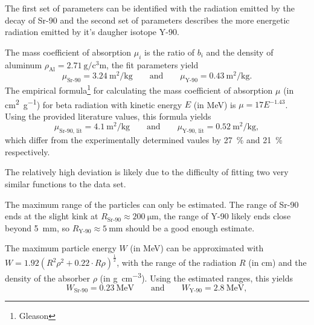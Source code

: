 The first set of parameters can be identified with the radiation emitted by the decay of Sr-90 and the second set of parameters describes the more energetic radiation emitted by it's daugher isotope Y-90.

The mass coefficient of absorption $\mu_i$ is the ratio of $b_i$ and the density of aluminum $\rho_\text{Al} = \SI{2.71}{\gram\per\cubic\centi\meter}$, the fit parameters yield
\begin{equation*}
	\mu_\text{Sr-90} = \SI{3.24}{\meter\squared\per\kilo\gram} \qquad \text{and} \qquad \mu_\text{Y-90} = \SI{0.43}{\meter\squared\per\kilo\gram}.
\end{equation*}
The empirical formula\footnote{Gleason} for calculating the mass coefficient of absorption $\mu$ (in \si{\centi\meter\squared\per\gram}) for beta radiation with kinetic energy $E$ (in \si{\MeV}) is $\mu = 17 E^{-1.43}$.
Using the provided literature values, this formula yields
\begin{equation*}
	\mu_\text{Sr-90, lit} = \SI{4.1}{\meter\squared\per\kilo\gram} \qquad \text{and} \qquad \mu_\text{Y-90, lit} = \SI{0.52}{\meter\squared\per\kilo\gram},
\end{equation*}
which differ from the experimentally determined vaules by \SI{27}{\percent} and \SI{21}{\percent} respectively.

The relatively high deviation is likely due to the difficulty of fitting two very similar functions to the data set.

The maximum range of the particles can only be estimated.
The range of Sr-90 ends at the slight kink at $R_\text{Sr-90} \approx \SI{200}{\um}$, the range of Y-90 likely ends close beyond \SI{5}{\mm}, so $R_\text{Y-90} \approx \SI{5}{\mm}$ should be a good enough estimate.

The maximum particle energy $W$ (in \si{\MeV}) can be approximated with $W = 1.92\left(R^2\rho^2 + 0.22 \cdot R\rho\right)^\frac{1}{2}$, with the range of the radiation $R$ (in \si{\cm}) and the density of the absorber $\rho$ (in \si{\gram\per\cm\cubed}).
Using the estimated ranges, this yields
\begin{equation*}
	W_\text{Sr-90} = \SI{0.23}{\MeV} \qquad \text{and} \qquad W_\text{Y-90} = \SI{2.8}{\MeV},
\end{equation*}

